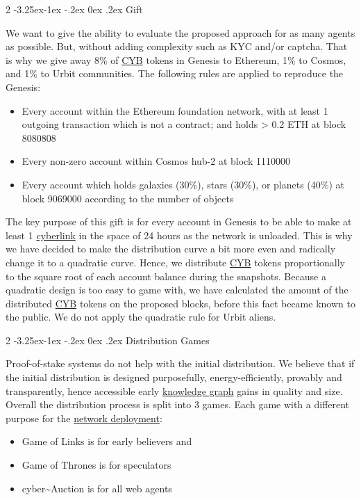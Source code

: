 \documentclass[8pt,oneside]{amsart}
\makeatletter
\newcommand{\linkred}[2]{\href{#1}{\color{red}{#2}}}
\renewcommand\subsection{\@startsection{subsection}
                                    {2}{\z@}
                                    {-3.25ex\@plus -1ex \@minus -.2ex}
                                    {0ex \@plus .2ex}
                                    {\play\Large}
                        }
\newcommand{\titleSection}[1]{\subsection{#1}}
\makeatother
\begin{document}
\titleSection{Gift}\label{gift}

We want to give the ability to evaluate the proposed approach for as many agents as possible. But, without adding complexity such as KYC and/or captcha. That is why we give away 8\% of {\hyperref[cyb]{CYB}} tokens in Genesis to Ethereum, 1\% to Cosmos, and 1\% to Urbit communities. The following rules are applied to reproduce the Genesis:
\begin{itemize}
 \item Every account within the Ethereum foundation network, with at least 1 outgoing transaction which is not a contract; and holds > 0.2 ETH at block 8080808
 \item Every non-zero account within Cosmos hub-2 at block 1110000
 \item Every account which holds galaxies (30\%), stars (30\%), or planets (40\%) at block 9069000 according to the number of objects
\end{itemize}

The key purpose of this gift is for every account in Genesis to be able to make at least 1 {\hyperref[cyberlinks]{cyberlink}} in the space of 24 hours as the network is unloaded. This is why we have decided to make the distribution curve a bit more even and radically change it to a quadratic curve. Hence, we distribute {\hyperref[cyb]{CYB}} tokens proportionally to the square root of each account balance during the snapshots. Because a quadratic design is too easy to game with, we have calculated the amount of the distributed {\hyperref[cyb]{CYB}} tokens on the proposed blocks, before this fact became known to the public. We do not apply the quadratic rule for Urbit aliens.

\titleSection{Distribution Games}\label{distribution-games}

Proof-of-stake systems do not help with the initial distribution. We believe that if the initial distribution is designed purposefully, energy-efficiently, provably and transparently, hence accessible early {\hyperref[knowledge-graph]{knowledge graph}} gains in quality and size. Overall the distribution process is split into 3 games. Each game with a different purpose for the {\hyperref[deployment]{network deployment}}:

\begin{itemize}
\item Game of Links is for early believers and \linkred{https://cybercongress.ai/docs/go-cyber/run_validator/}{Genesis validators}
\item Game of Thrones is for speculators
\item cyber\~{}Auction is for all web agents
\end{itemize}
\end{document}
